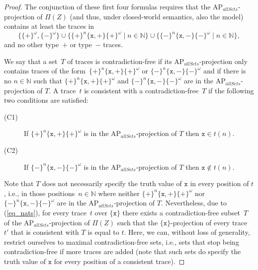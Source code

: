 \documentclass[dvipsnames,10pt,a4paper]{amsart}
\theoremstyle{definition}
\theoremstyle{remark}
\newcommand{\nats}{\mathbb{N}}
\newcommand{\set}[1]{\{#1\}}
\newcommand{\ap}[0]{\mathrm{AP}}
\newcommand{\posprop}{\mathtt{+}}
\newcommand{\negprop}{\mathtt{-}}
\newcommand{\inprop}{\mathtt{x}}
\newcommand{\allsets}{{\mathit{allSets}}}
\begin{document}
\begin{proof}
The conjunction of these first four formulas requires that the $\ap_\allsets$-projection of $\Pi(Z) $ (and thus, under closed-world semantics, also the model) contains at least the traces in
\begin{equation}
    \label{eq_nats}
\set{ \set{\posprop}^\omega,\set{\negprop}^\omega} \cup \set{\set{\posprop}^n \set{\inprop,\posprop} \set{\posprop}^\omega \mid n\in\nats} \cup \set{\set{\negprop}^n \set{\inprop,\negprop} \set{\negprop}^\omega \mid n\in\nats},
\end{equation}
and no other type~$\posprop$ or type~$\negprop$ traces.

We say that a set~$T$ of traces is contradiction-free if its $\ap_\allsets$-projection only contains traces of the form~$\set{\posprop}^n \set{\inprop,\posprop} \set{\posprop}^\omega$ or $\set{\negprop}^n \set{\inprop,\negprop} \set{\negprop}^\omega$ and if there is no $n \in \nats$ such that $\set{\posprop}^n \set{\inprop,\posprop} \set{\posprop}^\omega$ and $\set{\negprop}^n \set{\inprop,\negprop} \set{\negprop}^\omega$ are in the $\ap_\allsets$-projection of $T$.
A trace~$t$ is consistent with a contradiction-free~$T$ if the following two conditions are satisfied:
\begin{description}
    \item[(C1)] If $\set{\posprop}^n \set{\inprop,\posprop} \set{\posprop}^\omega $ is in the $\ap_\allsets$-projection of $T$ then $\inprop\in t(n)$.
    \item[(C2)] If $\set{\negprop}^n \set{\inprop,\negprop} \set{\negprop}^\omega $ is in the $\ap_\allsets$-projection of $T$ then $\inprop\notin t(n)$.
\end{description}
Note that $T$ does not necessarily specify the truth value of $\inprop$ in every position of $t$, i.e., in those positions~$n\in\nats$ where neither $\set{\posprop}^n \set{\inprop,\posprop} \set{\posprop}^\omega$ nor $\set{\negprop}^n \set{\inprop,\negprop} \set{\negprop}^\omega$ are in the $\ap_\allsets$-projection of $T$.
Nevertheless, due to (\ref{eq_nats}), for every trace~$t$ over $\set{\inprop}$ there exists a contradiction-free subset~$T$ of the $\ap_\allsets$-projection of $\Pi(Z)$ such that the $\set{\inprop}$-projection of every trace~$t'$ that is consistent with $T$ is equal to $t$. 
Here, we can, without loss of generality, restrict ourselves to maximal contradiction-free sets, i.e., sets that stop being contradiction-free if more traces are added (note that such sets do specify the truth value of $\inprop$ for every position of a consistent trace).


\end{proof}
\end{document}

